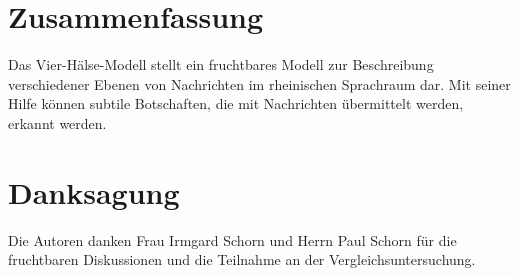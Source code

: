 \documentclass[11pt,DIV16,twocolumn]{scrartcl}
\begin{document}
\section{Zusammenfassung}

Das Vier-Hälse-Modell stellt ein fruchtbares Modell zur Beschreibung
verschiedener Ebenen von Nachrichten im rheinischen Sprachraum dar.
Mit seiner Hilfe können subtile Botschaften, die mit Nachrichten
übermittelt werden, erkannt werden.

\section*{Danksagung}

Die Autoren danken Frau Irmgard Schorn und Herrn Paul Schorn für die
fruchtbaren Diskussionen und die Teilnahme an der
Vergleichsuntersuchung.



\end{document}

